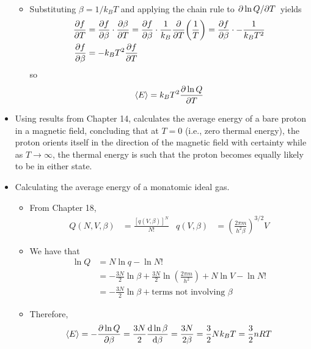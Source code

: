 \documentclass[../notes.tex]{subfiles}
\begin{document}
\begin{itemize}
\begin{itemize}
\begin{align*}
        \end{align*}
        \item Substituting $\beta=1/k_BT$ and applying the chain rule to $\pdv*{\ln Q}{T}$ yields
        \begin{align*}
            \pdv{f}{T} &= \pdv{f}{\beta}\cdot\pdv{\beta}{T}
            = \pdv{f}{\beta}\cdot\frac{1}{k_B}\pdv{T}(\frac{1}{T})
            = \pdv{f}{\beta}\cdot-\frac{1}{k_BT^2}\\
            \pdv{f}{\beta} &= -k_BT^2\pdv{f}{T}
        \end{align*}
        so
        \begin{equation*}
            \left\langle{E}\right\rangle = k_BT^2\pdv{\ln Q}{T}
        \end{equation*}
    \end{itemize}
    \item Using results from Chapter 14, \textcite{bib:McQuarrieSimon} calculates the average energy of a bare proton in a magnetic field, concluding that at $T=0$ (i.e., zero thermal energy), the proton orients itself in the direction of the magnetic field with certainty while as $T\to\infty$, the thermal energy is such that the proton becomes equally likely to be in either state.
    \item Calculating the average energy of a monatomic ideal gas.
    \begin{itemize}
        \item From Chapter 18,
        \begin{align*}
            Q(N,V,\beta) &= \frac{[q(V,\beta)]^N}{N!}&
            q(V,\beta) &= \left( \frac{2\pi m}{h^2\beta} \right)^{3/2}V
        \end{align*}
        \item We have that
        \begin{align*}
            \ln Q &= N\ln q-\ln N!\\
            &= -\frac{3N}{2}\ln\beta+\frac{3N}{2}\ln\left( \frac{2\pi m}{h^2} \right)+N\ln V-\ln N!\\
            &= -\frac{3N}{2}\ln\beta+\text{terms not involving }\beta
        \end{align*}
        \item Therefore,
        \begin{equation*}
            \left\langle{E}\right\rangle = -\pdv{\ln Q}{\beta} = \frac{3N}{2}\dv{\ln\beta}{\beta} = \frac{3N}{2\beta} = \frac{3}{2}Nk_BT = \frac{3}{2}nRT
        \end{equation*}
    \end{itemize}

\end{itemize}
\end{document}
